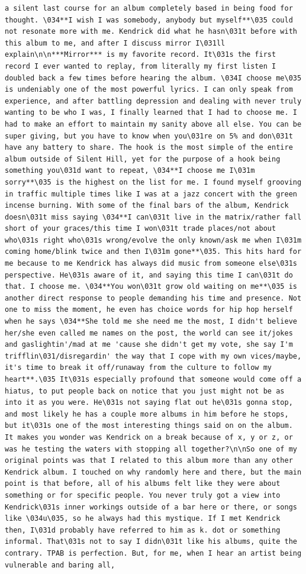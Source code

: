 \documentclass[
  letterpaper,
  DIV=11,
  numbers=noendperiod]{scrreprt}
\begin{document}
\begin{verbatim}
a silent last course for an album completely based in being food for thought. \034**I wish I was somebody, anybody but myself**\035 could not resonate more with me. Kendrick did what he hasn\031t before with this album to me, and after I discuss mirror I\031ll explain\n\n***Mirror*** is my favorite record. It\031s the first record I ever wanted to replay, from literally my first listen I doubled back a few times before hearing the album. \034I choose me\035 is undeniably one of the most powerful lyrics. I can only speak from experience, and after battling depression and dealing with never truly wanting to be who I was, I finally learned that I had to choose me. I had to make an effort to maintain my sanity above all else. You can be super giving, but you have to know when you\031re on 5% and don\031t have any battery to share. The hook is the most simple of the entire album outside of Silent Hill, yet for the purpose of a hook being something you\031d want to repeat, \034**I choose me I\031m sorry**\035 is the highest on the list for me. I found myself grooving in traffic multiple times like I was at a jazz concert with the green incense burning. With some of the final bars of the album, Kendrick doesn\031t miss saying \034**I can\031t live in the matrix/rather fall short of your graces/this time I won\031t trade places/not about who\031s right who\031s wrong/evolve the only known/ask me when I\031m coming home/blink twice and then I\031m gone**\035. This hits hard for me because to me Kendrick has always did music from someone else\031s perspective. He\031s aware of it, and saying this time I can\031t do that. I choose me. \034**You won\031t grow old waiting on me**\035 is another direct response to people demanding his time and presence. Not one to miss the moment, he even has choice words for hip hop herself when he says \034**She told me she need me the most, I didn't believe her/she even called me names on the post, the world can see it/jokes and gaslightin'/mad at me 'cause she didn't get my vote, she say I'm trifflin\031/disregardin' the way that I cope with my own vices/maybe, it's time to break it off/runaway from the culture to follow my heart**.\035 It\031s especially profound that someone would come off a hiatus, to put people back on notice that you just might not be as into it as you were. He\031s not saying flat out he\031s gonna stop, and most likely he has a couple more albums in him before he stops, but it\031s one of the most interesting things said on on the album. It makes you wonder was Kendrick on a break because of x, y or z, or was he testing the waters with stopping all together?\n\nSo one of my original points was that I related to this album more than any other Kendrick album. I touched on why randomly here and there, but the main point is that before, all of his albums felt like they were about something or for specific people. You never truly got a view into Kendrick\031s inner workings outside of a bar here or there, or songs like \034u\035, so he always had this mystique. If I met Kendrick then, I\031d probably have referred to him as k. dot or something informal. That\031s not to say I didn\031t like his albums, quite the contrary. TPAB is perfection. But, for me, when I hear an artist being vulnerable and baring all, 
\end{verbatim}
\end{document}
